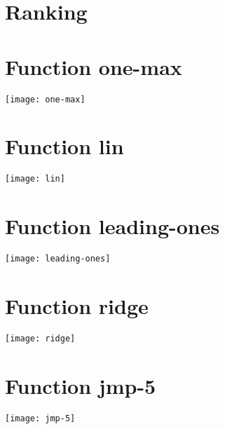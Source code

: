 \graphicspath{{../graphics/}}
\section{Ranking}
\begin{center}

\end{center}

\newpage
\section{Function one-max}
\begin{center}

\end{center}
\begin{center}
\texttt{[image: one-max]}
\end{center}
\newpage
\section{Function lin}
\begin{center}

\end{center}
\begin{center}
\texttt{[image: lin]}
\end{center}
\newpage
\section{Function leading-ones}
\begin{center}

\end{center}
\begin{center}
\texttt{[image: leading-ones]}
\end{center}
\newpage
\section{Function ridge}
\begin{center}

\end{center}
\begin{center}
\texttt{[image: ridge]}
\end{center}
\newpage
\section{Function jmp-5}
\begin{center}

\end{center}
\begin{center}
\texttt{[image: jmp-5]}
\end{center}
\newpage
